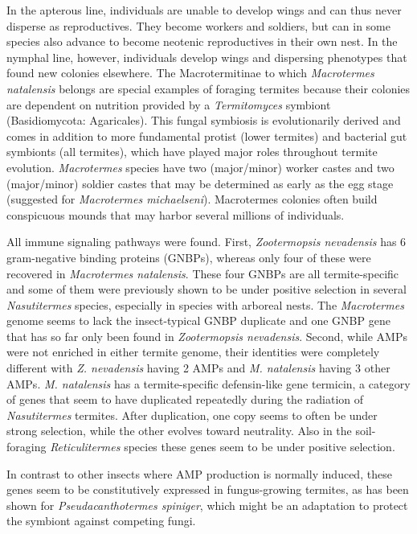\documentclass[11pt]{article}
\begin{document}
\begin{sloppypar}
In the apterous line, individuals are unable to develop wings and can thus never disperse as reproductives. They become workers and soldiers, but can in some species also advance to become neotenic reproductives in their own nest. 
In the nymphal line, however, individuals develop wings and dispersing phenotypes that found new colonies elsewhere. 
The Macrotermitinae to which \textit{Macrotermes natalensis} belongs are special examples of foraging termites because their colonies are dependent on nutrition provided by a \textit{Termitomyces} symbiont (Basidiomycota: Agaricales). 
This fungal symbiosis is evolutionarily derived and comes in addition to more fundamental protist (lower termites) and bacterial gut symbionts (all termites), which have played major roles throughout termite evolution. 
\textit{Macrotermes} species have two (major/minor) worker castes and two (major/minor) soldier castes that may be determined as early as the egg stage (suggested for \textit{Macrotermes michaelseni}). 
Macrotermes colonies often build conspicuous mounds that may harbor several millions of individuals.
\par
All immune signaling pathways were found. 
First, \textit{Zootermopsis nevadensis} has 6 gram-negative binding proteins (GNBPs), whereas only four of these were recovered in \textit{Macrotermes natalensis}. 
These four GNBPs are all termite-specific and some of them were previously shown to be under positive selection in several \textit{Nasutitermes} species, especially in species with arboreal nests. 
The \textit{Macrotermes} genome seems to lack the insect-typical GNBP duplicate and one GNBP gene that has so far only been found in \textit{Zootermopsis nevadensis}. 
Second, while AMPs were not enriched in either termite genome, their identities were completely different with \textit{Z. nevadensis} having 2 AMPs and \textit{M. natalensis} having 3 other AMPs. 
\textit{M. natalensis} has a termite-specific defensin-like gene termicin, a category of genes that seem to have duplicated repeatedly during the radiation of \textit{Nasutitermes} termites. 
After duplication, one copy seems to often be under strong selection, while the other evolves toward neutrality. 
Also in the soil-foraging \textit{Reticulitermes} species these genes seem to be under positive selection.
\par
In contrast to other insects where AMP production is normally induced, these genes seem to be constitutively expressed in fungus-growing termites, as has been shown for \textit{Pseudacanthotermes spiniger}, which might be an adaptation to protect the symbiont against competing fungi. 

\end{sloppypar}
\end{document}
